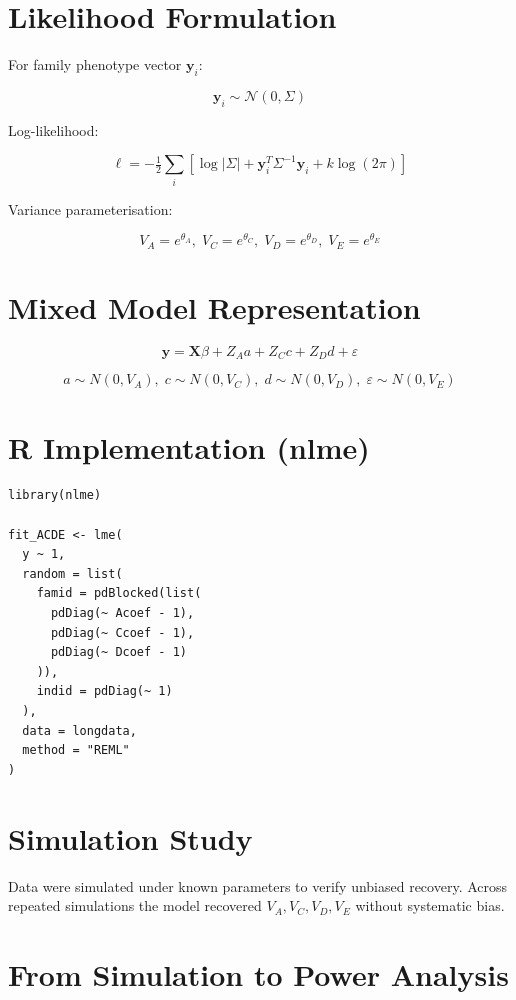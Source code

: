 \documentclass[12pt]{article}
\begin{document}
\section{Likelihood Formulation}

For family phenotype vector $\mathbf y_i$:

\[
\mathbf y_i \sim \mathcal N(0,\Sigma)
\]

Log-likelihood:

\[
\ell = -\tfrac12 \sum_i
\left[\log|\Sigma|+\mathbf y_i^T\Sigma^{-1}\mathbf y_i+k\log(2\pi)\right]
\]

Variance parameterisation:

\[
V_A=e^{\theta_A},\;
V_C=e^{\theta_C},\;
V_D=e^{\theta_D},\;
V_E=e^{\theta_E}
\]

\section{Mixed Model Representation}

\[
\mathbf y = \mathbf X\beta + Z_A a + Z_C c + Z_D d + \varepsilon
\]

\[
a\sim N(0,V_A),\;
c\sim N(0,V_C),\;
d\sim N(0,V_D),\;
\varepsilon\sim N(0,V_E)
\]

\section{R Implementation (nlme)}

\begin{verbatim}
library(nlme)

fit_ACDE <- lme(
  y ~ 1,
  random = list(
    famid = pdBlocked(list(
      pdDiag(~ Acoef - 1),
      pdDiag(~ Ccoef - 1),
      pdDiag(~ Dcoef - 1)
    )),
    indid = pdDiag(~ 1)
  ),
  data = longdata,
  method = "REML"
)
\end{verbatim}

\section{Simulation Study}

Data were simulated under known parameters to verify unbiased recovery.
Across repeated simulations the model recovered $V_A,V_C,V_D,V_E$
without systematic bias.

\section{From Simulation to Power Analysis}
\end{document}

